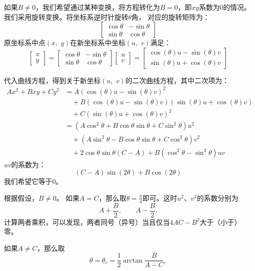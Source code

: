 \documentclass[12pt,UTF8]{ctexbook}
\begin{document}
如果$B\neq 0$，我们希望通过某种变换，将方程转化为$B = 0$，即$xy$系数为$0$的情况。我们采用旋转变换。将坐标系逆时针旋转$\theta$角，
对应的旋转矩阵为：
$$
\begin{bmatrix}
    \cos{\theta} & -\sin{\theta} \\
    \sin{\theta} & \cos{\theta} 
\end{bmatrix}
$$
原坐标系中点$(x,\,\,y)$在新坐标系中坐标$(u,\,\,v)$满足：
$$
\begin{bmatrix}
    x \\ y
\end{bmatrix}
=
\begin{bmatrix}
    \cos{\theta} & -\sin{\theta} \\
    \sin{\theta} & \cos{\theta} 
\end{bmatrix}
\begin{bmatrix}
    u \\ v
\end{bmatrix}
= 
\begin{bmatrix}
    \cos{(\theta)}u - \sin{(\theta)}v \\ \sin{(\theta)}u + \cos{(\theta)}v
\end{bmatrix}
$$


代入曲线方程，得到关于新坐标$(u,\,\,v)$的二次曲线方程，其中二次项为：
\begin{align*}
    Ax^2 + Bxy + Cy^2 &= A(\cos{(\theta)}u - \sin{(\theta)}v)^2 \\
    &\quad + B(\cos{(\theta)}u - \sin{(\theta)}v)(\sin{(\theta)}u + \cos{(\theta)}v) \\
    &\quad + C(\sin{(\theta)}u + \cos{(\theta)}v)^2 \\
    &= (A\cos^2{\theta} + B\cos{\theta}\sin{\theta} + C\sin^2{\theta})u^2 \\
    &\quad + (A\sin^2{\theta} - B\cos{\theta}\sin{\theta} + C\cos^2{\theta})v^2 \\
    &\quad + 2\cos{\theta}\sin{\theta}(C - A) + B(\cos^2{\theta} - \sin^2{\theta})uv
\end{align*}
$uv$的系数为：
$$ (C - A)\sin{(2\theta)} + B\cos{(2\theta)} $$
我们希望它等于$0$。

根据假设，$B\neq 0$。
如果$A = C$，那么取$\theta = \frac{\pi}{4}$即可。这时$u^2$、$v^2$的系数分别为
$$ A + \frac{B}{2}, \qquad A - \frac{B}{2}. $$
计算两者乘积，可以发现，两者同号（异号）当且仅当$4AC - B^2$大于（小于）零。

如果$A\neq C$，那么取
$$\theta = \theta_c = \frac{1}{2} \arctan{\frac{B}{A - C}},$$
\end{document}
